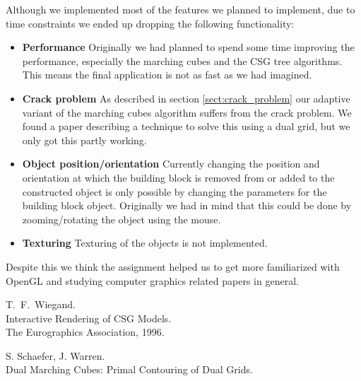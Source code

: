 \documentclass[a4wide,10pt,twocolumn]{article}
\begin{document}
Although we implemented most of the features we planned to implement, due to time constraints we ended up dropping the following functionality:

\begin{itemize}
    \item[] \textbf{Performance} Originally we had planned to spend some time improving the performance, especially the marching cubes and the CSG tree algorithms. This means the final application is not as fast as we had imagined.
    \item[] \textbf{Crack problem} As described in section \ref{sect:crack_problem} our adaptive variant of the marching cubes algorithm suffers from the crack problem. We found a paper \cite{DMC} describing a technique to solve this using a dual grid, but we only got this partly working.
    \item[] \textbf{Object position/orientation} Currently changing the position and orientation at which the building block is removed from or added to the constructed object is only possible by changing the parameters for the building block object. Originally we had in mind that this could be done by zooming/rotating the object using the mouse.
    \item[] \textbf{Texturing} Texturing of the objects is not implemented.
\end{itemize}

Despite this we think the assignment helped us to get more familiarized with OpenGL and studying computer graphics related papers in general.


\begin{thebibliography}{99}
    T.~F.~Wiegand.\\
    Interactive Rendering of CSG Models.\\
    The Eurographics Association, 1996.

    S. Schaefer, J. Warren. \\
    Dual Marching Cubes: Primal Contouring of Dual Grids. \\

\end{thebibliography}
\end{document}
